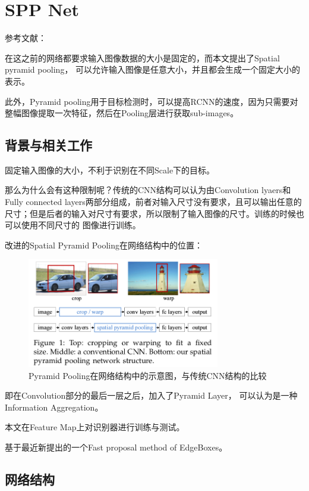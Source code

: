 \section{SPP Net}

参考文献：\cite{he2014spatial}

在这之前的网络都要求输入图像数据的大小是固定的，而本文提出了Spatial pyramid pooling， 可以允许输入图像是任意大小，并且都会生成一个固定大小的表示。

此外，Pyramid pooling用于目标检测时，可以提高RCNN的速度，因为只需要对整幅图像提取一次特征，然后在Pooling层进行获取sub-images。

\subsection{背景与相关工作}

固定输入图像的大小，不利于识别在不同Scale下的目标。

那么为什么会有这种限制呢？传统的CNN结构可以认为由Convolution lyaers和Fully connected layers两部分组成，前者对输入尺寸没有要求，且可以输出任意的尺寸；但是后者的输入对尺寸有要求，所以限制了输入图像的尺寸。训练的时候也可以使用不同尺寸的
图像进行训练。

改进的Spatial Pyramid Pooling在网络结构中的位置：
\begin{figure}[!hbtp]
\centering
\includegraphics[width=0.75\textwidth]{FeatureExtraction/SPPNet0.png}
\caption{Pyramid Pooling在网络结构中的示意图，与传统CNN结构的比较}
\label{SPPNet0}
\end{figure}

即在Convolution部分的最后一层之后，加入了Pyramid Layer， 可以认为是一种Information Aggregation。

本文在Feature Map上对识别器进行训练与测试。

基于最近新提出的一个Fast proposal method of EdgeBoxes。

\subsection{网络结构}


